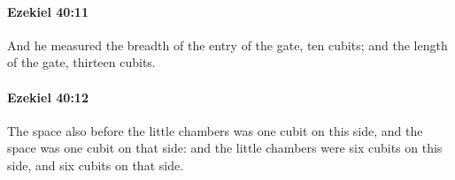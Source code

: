 		\paragraph{Ezekiel 40:11} %
			\label{EZEKIEL-40-11}

			And he measured the breadth of the entry of the gate, ten cubits; and the length of the gate, thirteen cubits.


		\paragraph{Ezekiel 40:12} %
			\label{EZEKIEL-40-12}

			The space also before the little chambers was one cubit on this side, and the space was one cubit on that side: and the little chambers were six cubits on this side, and six cubits on that side.


